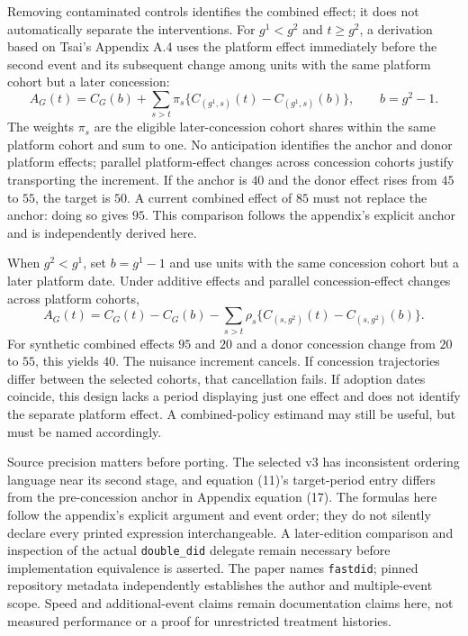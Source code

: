 Removing contaminated controls identifies the combined effect; it does not automatically separate the interventions.
For $g^1<g^2$ and $t\geq g^2$, a derivation based on Tsai's Appendix A.4 uses the platform effect immediately before the
second event and its subsequent change among units with the same platform cohort but a later concession:
\[
 A_G(t)=C_G(b)+\sum_{s>t}\pi_s\{C_{(g^1,s)}(t)-C_{(g^1,s)}(b)\},\qquad b=g^2-1.
\]
The weights $\pi_s$ are the eligible later-concession cohort shares within the same platform cohort and sum to one.
No anticipation identifies the anchor and donor platform effects; parallel platform-effect changes across concession
cohorts justify transporting the increment. If the anchor is $40$ and the donor effect rises from $45$ to $55$, the
target is $50$. A current combined effect of $85$ must not replace the anchor: doing so gives $95$.
This comparison follows the appendix's explicit anchor and is independently derived here.\citep{exec28_panel_tsai,exec28_panel_reference}

When $g^2<g^1$, set $b=g^1-1$ and use units with the same concession cohort but a later platform date. Under additive
effects and parallel concession-effect changes across platform cohorts,
\[
 A_G(t)=C_G(t)-C_G(b)-\sum_{s>t}\rho_s\{C_{(s,g^2)}(t)-C_{(s,g^2)}(b)\}.
\]
For synthetic combined effects $95$ and $20$ and a donor concession change from $20$ to $55$, this yields $40$.
The nuisance increment cancels. If concession trajectories differ between the selected cohorts, that cancellation fails.
If adoption dates coincide, this design lacks a period displaying just one effect and does not identify the separate
platform effect. A combined-policy estimand may still be useful, but must be named accordingly.\citep{exec28_panel_tsai,exec28_panel_reference}

Source precision matters before porting. The selected v3 has inconsistent ordering language near its second stage, and
equation (11)'s target-period entry differs from the pre-concession anchor in Appendix equation (17).
The formulas here follow the appendix's explicit argument and event order; they do not silently declare every printed
expression interchangeable. A later-edition comparison and inspection of the actual \texttt{double\_did} delegate remain
necessary before implementation equivalence is asserted. The paper names \texttt{fastdid}; pinned repository metadata
independently establishes the author and multiple-event scope. Speed and additional-event claims remain documentation
claims here, not measured performance or a proof for unrestricted treatment histories.\citep{exec28_panel_tsai,exec28_panel_software}

